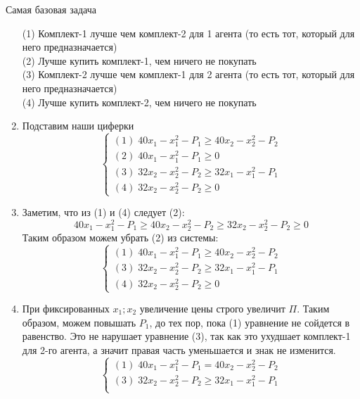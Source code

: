\begin{mybox}{Самая базовая задача}
\begin{enumerate}
\begin{equation*}
        \end{equation*}
        (1) Комплект-1 лучше чем комплект-2 для 1 агента (то есть тот, который для него предназначается)\\
        (2) Лучше купить комплект-1, чем ничего не покупать\\
        (3) Комплект-2 лучше чем комплект-1 для 2 агента (то есть тот, который для него предназначается)\\
        (4) Лучше купить комплект-2, чем ничего не покупать
        \item Подставим наши циферки
        \begin{equation*}
         \begin{cases}
           (1)\;40x_1-x_1^2-P_1\geq 40x_2-x_2^2-P_2
           \\
           (2)\;40x_1-x_1^2-P_1\geq 0
           \\
           (3)\;32x_2-x_2^2-P_2\geq 32x_1-x_1^2-P_1
           \\
           (4)\;32x_2-x_2^2-P_2\geq 0
         \end{cases}
        \end{equation*}
        \item Заметим, что из (1) и (4) следует (2):
        $$40x_1-x_1^2-P_1\geq 40x_2-x_2^2-P_2\geq 32x_2-x_2^2-P_2\geq 0$$
        Таким образом можем убрать (2) из системы:
        \begin{equation*}
         \begin{cases}
           (1)\;40x_1-x_1^2-P_1\geq 40x_2-x_2^2-P_2
           \\
           (3)\;32x_2-x_2^2-P_2\geq 32x_1-x_1^2-P_1
           \\
           (4)\;32x_2-x_2^2-P_2\geq 0
         \end{cases}
        \end{equation*}
        \item При фиксированных $x_1;x_2$ увеличение цены строго увеличит $\Pi$. Таким образом, можем повышать $P_1$, до тех пор, пока (1) уравнение не сойдется в равенство. Это не нарушает уравнение (3), так как это ухудшает комплект-1 для 2-го агента, а значит правая часть уменьшается и знак не изменится.
        \begin{equation*}
         \begin{cases}
           (1)\;40x_1-x_1^2-P_1= 40x_2-x_2^2-P_2
           \\
           (3)\;32x_2-x_2^2-P_2\geq 32x_1-x_1^2-P_1
           \\

\end{cases}
\end{equation*}
\end{enumerate}
\end{mybox}
